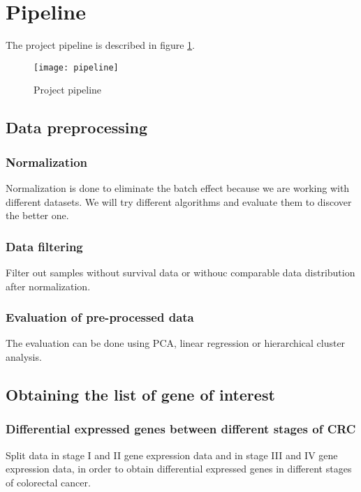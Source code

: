 \documentclass[fleqn,10pt]{SelfArx} %
\begin{document}
\section{Pipeline}
The project pipeline is described in figure \ref{fig:pipeline}.
\begin{figure}[ht]\centering %
	\texttt{[image: pipeline]}
	\caption{Project pipeline}
	\label{fig:pipeline}
\end{figure}

	\subsection{Data preprocessing}

		\subsubsection{Normalization}
		Normalization is done to eliminate the batch effect because we are working with different datasets.
		We will try different algorithms and evaluate them to discover the better one.

		\subsubsection{Data filtering}
		Filter out samples without survival data or withouc comparable data distribution after normalization.

		\subsubsection{Evaluation of pre-processed data}
		The evaluation can be done using PCA, linear regression or hierarchical cluster analysis.

	\subsection{Obtaining the list of gene of interest}

		\subsubsection{Differential expressed genes between different stages of CRC}
		Split data in stage I and II gene expression data and in stage III and IV gene expression data, in order to obtain differential expressed genes in different stages of colorectal cancer.
\end{document}
